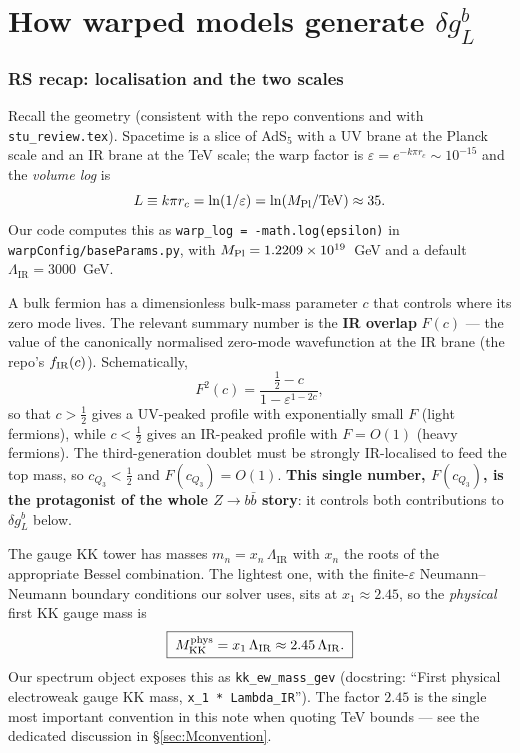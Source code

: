 \documentclass[11pt]{article}
\newcommand{\MKK}{M_{\mathrm{KK}}}
\newcommand{\LIR}{\Lambda_{\mathrm{IR}}}
\newcommand{\eps}{\varepsilon}
\newcommand{\code}[1]{\texttt{#1}}
\newcommand{\dgL}{\delta g_L^b}
\theoremstyle{definition}
\begin{document}
\part{How warped models generate $\dgL$}
\label{part:rs}

\section{RS recap: localisation and the two scales}
\label{sec:rsrecap}

Recall the geometry (consistent with the repo conventions and with
\code{stu\_review.tex}). Spacetime is a slice of AdS$_5$ with a UV brane at the
Planck scale and an IR brane at the TeV scale; the warp factor is
$\eps = e^{-k\pi r_c}\sim 10^{-15}$ and the \emph{volume log} is
\begin{equation}
L \equiv k\pi r_c = \ln(1/\eps) = \ln(M_{\rm Pl}/\mathrm{TeV}) \approx 35.
\label{eq:L}
\end{equation}
Our code computes this as \code{warp\_log = -math.log(epsilon)} in
\code{warpConfig/baseParams.py}, with $M_{\rm Pl}=1.2209\times10^{19}$~GeV and a
default $\LIR = 3000$~GeV.

A bulk fermion has a dimensionless bulk-mass parameter $c$ that controls where
its zero mode lives. The relevant summary number is the \textbf{IR overlap}
$F(c)$ --- the value of the canonically normalised zero-mode wavefunction at the
IR brane (the repo's $f_{\rm IR}(c)$). Schematically,
\begin{equation}
F^2(c) = \frac{\tfrac12 - c}{1 - \eps^{1-2c}},
\end{equation}
so that $c>\tfrac12$ gives a UV-peaked profile with exponentially small $F$
(light fermions), while $c<\tfrac12$ gives an IR-peaked profile with $F=O(1)$
(heavy fermions). The third-generation doublet must be strongly IR-localised to
feed the top mass, so $c_{Q_3}<\tfrac12$ and $F(c_{Q_3})=O(1)$. \textbf{This
single number, $F(c_{Q_3})$, is the protagonist of the whole $Z\to b\bar b$
story}: it controls both contributions to $\dgL$ below.

The gauge KK tower has masses $m_n = x_n\,\LIR$ with $x_n$ the roots of the
appropriate Bessel combination. The lightest one, with the finite-$\eps$
Neumann--Neumann boundary conditions our solver uses, sits at
$x_1\approx 2.45$, so the \emph{physical} first KK gauge mass is
\begin{equation}
\boxed{\;\MKK^{\rm phys} = x_1\,\LIR \approx 2.45\,\LIR.\;}
\label{eq:x1}
\end{equation}
Our spectrum object exposes this as \code{kk\_ew\_mass\_gev} (docstring: ``First
physical electroweak gauge KK mass, \code{x\_1 * Lambda\_IR}''). The factor
$2.45$ is the single most important convention in this note when quoting TeV
bounds --- see the dedicated discussion in \S\ref{sec:Mconvention}.
\end{document}
